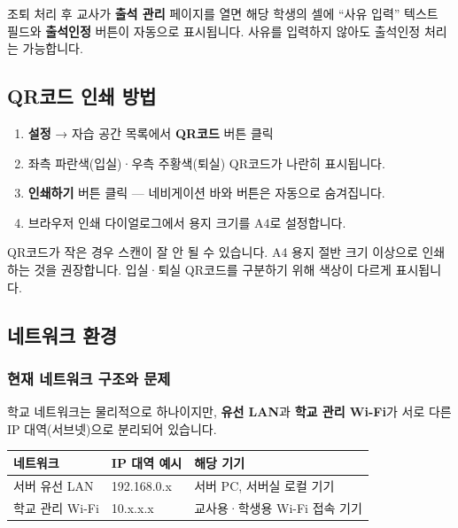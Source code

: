 \documentclass[a4paper,12pt]{article}
\newcommand{\menu}[1]{\textcolor{primary}{\textbf{#1}}}
\begin{document}
\begin{notebox}
  조퇴 처리 후 교사가 \menu{출석 관리} 페이지를 열면 해당 학생의 셀에
  ``사유 입력'' 텍스트 필드와 \menu{출석인정} 버튼이 자동으로 표시됩니다.
  사유를 입력하지 않아도 출석인정 처리는 가능합니다.
\end{notebox}

\subsection{QR코드 인쇄 방법}

\begin{enumerate}[leftmargin=1.5em]
    \item \menu{설정} → 자습 공간 목록에서 \menu{QR코드} 버튼 클릭
    \item 좌측 파란색(입실)·우측 주황색(퇴실) QR코드가 나란히 표시됩니다.
    \item \menu{인쇄하기} 버튼 클릭 — 네비게이션 바와 버튼은 자동으로 숨겨집니다.
    \item 브라우저 인쇄 다이얼로그에서 용지 크기를 A4로 설정합니다.
\end{enumerate}

\begin{tipbox}
  QR코드가 작은 경우 스캔이 잘 안 될 수 있습니다.
  A4 용지 절반 크기 이상으로 인쇄하는 것을 권장합니다.
  입실·퇴실 QR코드를 구분하기 위해 색상이 다르게 표시됩니다.
\end{tipbox}

\subsection{네트워크 환경}

\subsubsection{현재 네트워크 구조와 문제}

학교 네트워크는 물리적으로 하나이지만, \textbf{유선 LAN}과 \textbf{학교 관리 Wi-Fi}가
서로 다른 IP 대역(서브넷)으로 분리되어 있습니다.

\begin{center}
\begin{tabular}{lll}
\toprule
\textbf{네트워크} & \textbf{IP 대역 예시} & \textbf{해당 기기} \\
\midrule
서버 유선 LAN & 192.168.0.x & 서버 PC, 서버실 로컬 기기 \\
학교 관리 Wi-Fi & 10.x.x.x & 교사용·학생용 Wi-Fi 접속 기기 \\
\bottomrule
\end{tabular}
\end{center}
\end{document}

